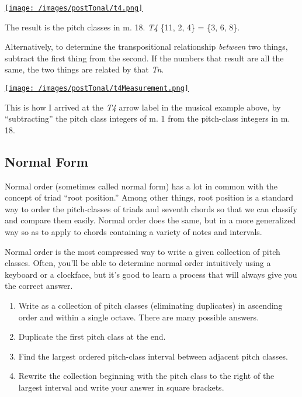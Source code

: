 \documentclass{book}
\providecommand{\tightlist}{%
  \setlength{\itemsep}{0pt}\setlength{\parskip}{0pt}}
\begin{document}
\href{/images/postTonal/t4.png}{\texttt{[image: /images/postTonal/t4.png]}}

The result is the pitch classes in m. 18. \emph{T4} \{11, 2, 4\} = \{3, 6,
8\}.

Alternatively, to determine the transpositional relationship \emph{between}
two things, subtract the first thing from the second. If the numbers that
result are all the same, the two things are related by that \emph{Tn}.

\href{/images/postTonal/t4Measurement.png}{\texttt{[image: /images/postTonal/t4Measurement.png]}}

This is how I arrived at the \emph{T4} arrow label in the musical example
above, by ``subtracting'' the pitch class integers of m. 1 from the
pitch-class integers in m. 18.

\hypertarget{normal-form}{%
\subsection{Normal Form}\label{normal-form}}

Normal order (sometimes called normal form) has a lot in common with the
concept of triad ``root position.'' Among other things, root position is a
standard way to order the pitch-classes of triads and seventh chords so that
we can classify and compare them easily. Normal order does the same, but in a
more generalized way so as to apply to chords containing a variety of notes
and intervals.

Normal order is the most compressed way to write a given collection of pitch
classes. Often, you'll be able to determine normal order intuitively using a
keyboard or a clockface, but it's good to learn a process that will always
give you the correct answer.

\begin{enumerate}
\def\labelenumi{\arabic{enumi}.}
\tightlist
\item
  Write as a collection of pitch classes (eliminating duplicates) in ascending
  order and within a single octave. There are many possible answers.
\item
  Duplicate the first pitch class at the end.
\item
  Find the largest ordered pitch-class interval between adjacent pitch
  classes.
\item
  Rewrite the collection beginning with the pitch class to the right of the
  largest interval and write your answer in square brackets.
\end{enumerate}
\end{document}
